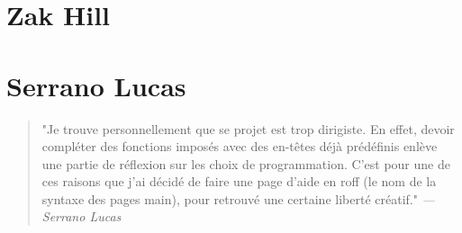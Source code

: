 \documentclass[a4paper,12pt]{report}
\begin{document}
\section*{Zak Hill}
\section*{Serrano Lucas}
\begin{quotation}
"Je trouve personnellement que se projet est trop dirigiste. En effet, devoir compléter des fonctions imposés avec des en-têtes déjà prédéfinis enlève une partie de réflexion sur les choix de programmation. C'est pour une de ces raisons que j'ai décidé de faire une page d'aide en roff (le nom de la syntaxe des pages main), pour retrouvé une certaine liberté créatif."
\emph{— Serrano Lucas}
\end{quotation}
\end{document}

